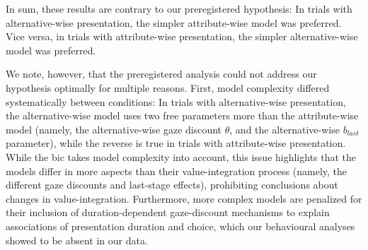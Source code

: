 \documentclass[11pt, a4paper, twocolumn, abstract]{scrartcl}
\begin{document}
In sum, these results are contrary to our preregistered hypothesis: In trials with alternative-wise presentation, the simpler attribute-wise model was preferred. Vice versa, in trials with attribute-wise presentation, the simpler alternative-wise model was preferred.
 
We note, however, that the preregistered analysis could not address our hypothesis optimally for multiple reasons. First, model complexity differed systematically between conditions: In trials with alternative-wise presentation, the alternative-wise model uses two free parameters more than the attribute-wise model (namely, the alternative-wise gaze discount $\theta$, and the alternative-wise $b_{last}$ parameter), while the reverse is true in trials with attribute-wise presentation. While the \gls{bic} takes model complexity into account, this issue highlights that the models differ in more aspects than their value-integration process (namely, the different gaze discounts and last-stage effects), prohibiting conclusions about changes in value-integration. Furthermore, more complex models are penalized for their inclusion of duration-dependent gaze-discount mechanisms to explain associations of presentation duration and choice, which our behavioural analyses showed to be absent in our data.
\end{document}
